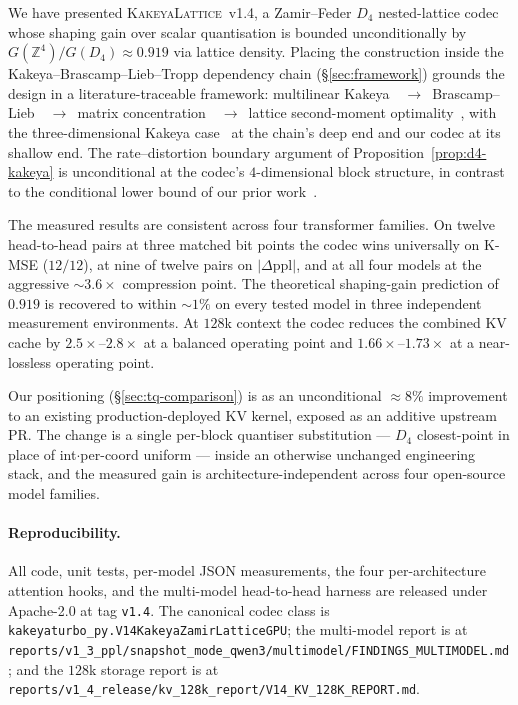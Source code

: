 \documentclass[11pt,a4paper]{article}
\theoremstyle{definition}
\theoremstyle{plain}
\newcommand{\Z}{\mathbb{Z}}
\newcommand{\abs}[1]{\left\lvert#1\right\rvert}
\begin{document}
We have presented \textsc{KakeyaLattice}~v1.4, a Zamir--Feder $D_4$
nested-lattice codec whose shaping gain over scalar quantisation is
bounded unconditionally by $G(\Z^4)/G(D_4) \approx 0.919$ via
lattice density. Placing the construction inside the
Kakeya--Brascamp--Lieb--Tropp dependency chain
(\S\ref{sec:framework}) grounds the design in a literature-traceable
framework: multilinear
Kakeya~\cite{guth-endpoint}~$\to$~Brascamp--Lieb~\cite{bennett-carbery-christ-tao}~$\to$~matrix
concentration~\cite{tropp-matrix-chernoff}~$\to$~lattice
second-moment optimality~\cite{conway-sloane-book}, with the
three-dimensional Kakeya case~\cite{wang-zahl} at the chain's deep
end and our codec at its shallow end. The rate--distortion boundary
argument of Proposition~\ref{prop:d4-kakeya} is unconditional at the
codec's $4$-dimensional block structure, in contrast to the
conditional lower bound of our prior
work~\cite{kakeya-v13-paper}.

The measured results are consistent across four transformer
families. On twelve head-to-head pairs at three matched bit points
the codec wins universally on K-MSE ($12/12$), at nine of twelve
pairs on $\abs{\Delta\mathrm{ppl}}$, and at all four models at the
aggressive $\sim\!3.6\times$ compression point. The theoretical
shaping-gain prediction of $0.919$ is recovered to within $\sim\!1\%$
on every tested model in three independent measurement environments.
At $128$k context the codec reduces the combined KV cache by
$2.5\times$--$2.8\times$ at a balanced operating point and
$1.66\times$--$1.73\times$ at a near-lossless operating point.

Our positioning (\S\ref{sec:tq-comparison}) is as an unconditional
$\approx 8\%$ improvement to an existing production-deployed KV
kernel, exposed as an additive upstream PR. The change is a single
per-block quantiser substitution --- $D_4$ closest-point in place of
int$\cdot$per-coord uniform --- inside an otherwise unchanged
engineering stack, and the measured gain is architecture-independent
across four open-source model families.

\paragraph{Reproducibility.}
All code, unit tests, per-model JSON measurements, the four
per-architecture attention hooks, and the multi-model head-to-head
harness are released under Apache-2.0 at tag \texttt{v1.4}. The
canonical codec class is
\texttt{kakeyaturbo\_py.V14KakeyaZamirLatticeGPU}; the multi-model
report is at
\texttt{reports/v1\_3\_ppl/snapshot\_mode\_qwen3/multimodel/FINDINGS\_MULTIMODEL.md};
and the $128$k storage report is at
\texttt{reports/v1\_4\_release/kv\_128k\_report/V14\_KV\_128K\_REPORT.md}.
\end{document}
